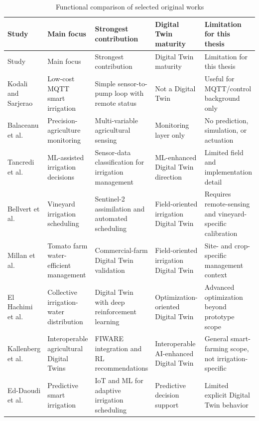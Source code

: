 \begin{footnotesize}
\setlength{\tabcolsep}{2pt}
\renewcommand{\arraystretch}{1.15}
\begin{longtable}{@{}p{}p{}p{}p{}p{}@{}}
\caption{Functional comparison of selected original works}
\label{tab:functional-comparison-original-works}\\
\toprule
Study & Main focus & Strongest contribution & Digital Twin maturity & Limitation for this thesis \\
\midrule
\endfirsthead
\toprule
Study & Main focus & Strongest contribution & Digital Twin maturity & Limitation for this thesis \\
\midrule
\endhead
Kodali and Sarjerao \cite{kodali2017mqttirrigation} & Low-cost MQTT smart irrigation & Simple sensor-to-pump loop with remote status & Not a Digital Twin & Useful for MQTT/control background only \\
Balaceanu et al. \cite{balaceanu2019libelium} & Precision-agriculture monitoring & Multi-variable agricultural sensing & Monitoring layer only & No prediction, simulation, or actuation \\
Tancredi et al. \cite{tancredi2025irrigationdt} & ML-assisted irrigation decisions & Sensor-data classification for irrigation management & ML-enhanced Digital Twin direction & Limited field and implementation detail \\
Bellvert et al. \cite{bellvert2023vineyarddt} & Vineyard irrigation scheduling & Sentinel-2 assimilation and automated scheduling & Field-oriented irrigation Digital Twin & Requires remote-sensing and vineyard-specific calibration \\
Millan et al. \cite{millan2025tomatodt} & Tomato farm water-efficient management & Commercial-farm Digital Twin validation & Field-oriented irrigation Digital Twin & Site- and crop-specific management context \\
El Hachimi et al. \cite{elhachimi2025collectiveirrigationdt} & Collective irrigation-water distribution & Digital Twin with deep reinforcement learning & Optimization-oriented Digital Twin & Advanced optimization beyond prototype scope \\
Kallenberg et al. \cite{kallenberg2025interoperabledt} & Interoperable agricultural Digital Twins & FIWARE integration and RL recommendations & Interoperable AI-enhanced Digital Twin & General smart-farming scope, not irrigation-specific \\
Ed-Daoudi et al. \cite{eddaoudi2024predictiveirrigation} & Predictive smart irrigation & IoT and ML for adaptive irrigation scheduling & Predictive decision support & Limited explicit Digital Twin behavior \\

\end{longtable}
\end{footnotesize}
